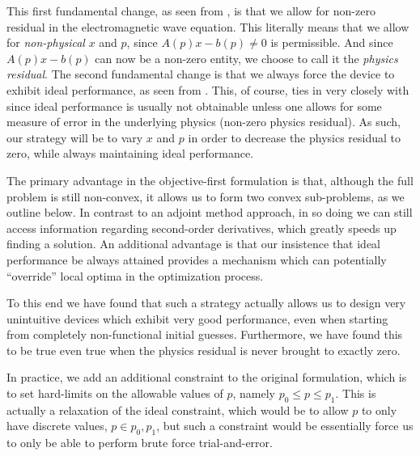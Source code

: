This first fundamental change, as seen from ,
    is that we allow for non-zero residual in the electromagnetic wave equation.
This literally means that we allow for \emph{non-physical} $x$ and $p$,
    since $A(p) x - b(p) \ne 0$ is permissible.
And since $A(p) x - b(p)$ can now be a non-zero entity, 
    we choose to call it the \emph{physics residual}.  
The second fundamental change
    is that we always force the device to exhibit ideal performance,
    as seen from .
This, of course, ties in very closely with  since
    ideal performance is usually not obtainable unless one
    allows for some measure of error in the underlying physics
    (non-zero physics residual).
As such, our strategy will be to vary $x$ and $p$
    in order to decrease the physics residual  to zero,
    while always maintaining ideal performance.

The primary advantage in the objective-first formulation is that,
    although the full problem is still non-convex,
    it allows us to form two convex sub-problems, as we outline below.
In contrast to an adjoint method approach,
    in so doing we can still access information regarding
    second-order derivatives, which greatly speeds up finding a solution.
An additional advantage is that our insistence
    that ideal performance be always attained
    provides a mechanism
    which can potentially ``override'' local optima 
    in the optimization process.

To this end we have found that such a strategy
    actually allows us to design very unintuitive devices
    which exhibit very good performance,
    even when starting from completely non-functional initial guesses.
Furthermore, we have found this to be true
    even true when the physics residual is never brought to exactly zero.


In practice, we add an additional constraint to the original formulation,
    which is to set hard-limits on the allowable values of $p$,
    namely $p_0 \le p \le p_1$.
This is actually a relaxation of the ideal constraint,
    which would be to allow $p$ to only have discrete values,
    $p \in p_0, p_1$,
    but such a constraint would be essentially force us to only
    be able to perform brute force trial-and-error.


